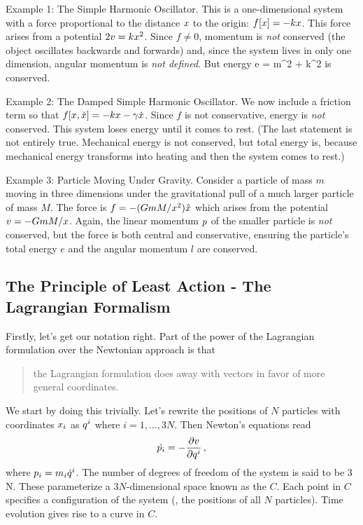 Example 1: The Simple Harmonic Oscillator. This is a one-dimensional system with a force proportional to the distance $x$ to the origin: $f\!\left[{x}\right] = -kx$. This force arises from a potential $2v = kx^2$. Since $f\neq 0$,  momentum is \emph{not} conserved (the object oscillates backwards and forwards) and, since the system lives in only one dimension, angular momentum is \emph{not defined}. But energy
\beq
e = m\dt\pvec^2 + k\pvec^2
\eeq
is conserved.

Example 2: The Damped Simple Harmonic Oscillator. We now include a friction term so that $f\!\left[{x,\dot{x}}\right] = -kx - \gamma\dot{x}$. Since $f$ is not conservative, energy is \emph{not} conserved. This system loses energy until it comes to rest. (The last statement is not entirely true. Mechanical energy is not conserved, but total energy is, because mechanical energy transforms into heating and then the system comes to rest.)

Example 3: Particle Moving Under Gravity. Consider a particle of mass $m$ moving in three dimensions under the gravitational pull of a much larger particle of mass $M$. The force is $f = -(GmM/x^2)\hat{x}$ which arises from the potential $v = -GmM/x$. Again, the linear momentum $p$ of the smaller particle is \emph{not} conserved, but the force is both central and conservative, ensuring the particle's total energy $e$ and the angular momentum $l$ are conserved.


\subsection{The Principle of Least Action - The Lagrangian Formalism}
Firstly, let's get our notation right. Part of the power of the Lagrangian formulation over the Newtonian approach is that 
\begin{quote}
the Lagrangian formulation does away with vectors in favor of more general coordinates. 
\end{quote}
We start by doing this trivially. Let's rewrite the positions of $N$ particles with coordinates $x_i$ as ${q}^{i}$ where $i=1,\dotsc,3N$. Then Newton's equations read
\begin{equation}\label{eq:newtonslawofmotion}
\dot{{p}_{i}} = -\dfrac{\partial{v}}{\partial{{q}^{i}}}\,,
\end{equation}
where ${p}_{i} = m_i{\dot{q}}^{i}$. The number of degrees of freedom of the system is said to be $3$N. These parameterize a $3N$-dimensional space known as the  $C$. Each point in $C$ specifies a configuration of the system (\ie, the positions of all $N$ particles). Time evolution gives rise to a curve in $C$.

